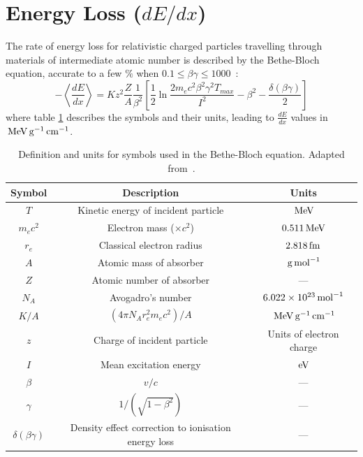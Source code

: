 \clearpage
\section{Energy Loss ($dE/dx$)}
The rate of energy loss for relativistic charged particles travelling through materials of intermediate atomic number is described by the Bethe-Bloch equation, accurate to a few $\%$ when $0.1 \le \beta\gamma \le 1000$~\citep{PDG2012}:
\begin{equation}\label{eqn:bethe-bloch}
    -\left\langle\frac{dE}{dx}\right\rangle = K z^2 \frac{Z}{A} \frac{1}{\beta^2}
        \left[
            \frac{1}{2} \ln\frac{2 m_e c^2 \beta^2 \gamma^2 T_{max}}{I^2}
            - \beta^2
            - \frac{\delta(\beta\gamma)}{2}
        \right]
\end{equation}
where table \ref{table:bethe-bloch-symbols} describes the symbols and their units, leading to $\frac{dE}{dx}$ values in $\,\mathrm{MeV} \,\mathrm{g}^{-1} \,\mathrm{cm}^{-1}$.

\begin{table}
    \centering
    \begin{tabular}{ccc}
        Symbol& Description & Units \\
        \hline
        \hline
        $T$ & Kinetic energy of incident particle & $\,\mathrm{MeV}$ \\
        $m_e c^2$ & Electron mass ($\times c^2$) & $0.511\,\mathrm{MeV}$ \\
        $r_e$ & Classical electron radius & $2.818\,\mathrm{fm}$ \\
        $A$ & Atomic mass of absorber & $\,\mathrm{g} \,\mathrm{mol}^{-1}$ \\
        $Z$ & Atomic number of absorber & --- \\
        $N_A$ & Avogadro's number & $6.022\times 10^{23} \,\mathrm{mol}^{-1}$ \\
        $K/A$ & $\left(4\pi N_A r_e^2 m_e c^2\right) / A $ & $\,\mathrm{MeV} \,\mathrm{g}^{-1} \,\mathrm{cm}^{-1}$ \\
        $z$ & Charge of incident particle & Units of electron charge \\
        $I$ & Mean excitation energy & $\,\mathrm{eV}$ \\
        $\beta$ & $v/c$ & --- \\
        $\gamma$ & $1 / \left(\sqrt{1-\beta^2}\right)$ & --- \\
        $\delta(\beta\gamma)$ & Density effect correction to ionisation energy loss & --- \\
        \hline
    \end{tabular}
    \caption[Definition of symbols used in Bethe-Bloch equation]{\label{table:bethe-bloch-symbols}Definition and units for symbols used in the Bethe-Bloch equation. Adapted from~\citep{PDG2012}.}
\end{table}

